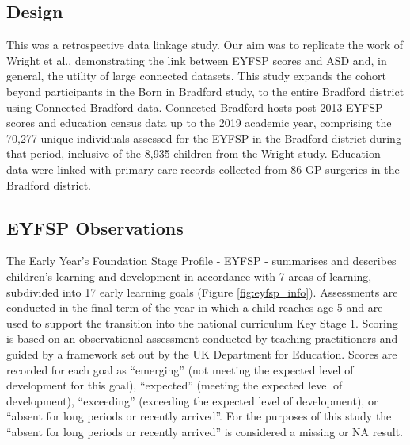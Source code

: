 
\subsection{Design}

This was a retrospective data linkage study. Our aim was to replicate the work of Wright et al., demonstrating the link between EYFSP scores and ASD and, in general, the utility of large connected datasets. This study expands the cohort beyond participants in the Born in Bradford study, to the entire Bradford district using Connected Bradford data. Connected Bradford hosts post-2013 EYFSP scores and education census data up to the 2019 academic year, comprising the 70,277 unique individuals assessed for the EYFSP in the Bradford district during that period, inclusive of the 8,935 children from the Wright study. Education data were linked with primary care records collected from 86 GP surgeries in the Bradford district.

\subsection{EYFSP Observations}

 The Early Year's Foundation Stage Profile - EYFSP - summarises and describes children's learning and development in accordance with 7 areas of learning, subdivided into 17 early learning goals (Figure \ref{fig:eyfsp_info}). Assessments are conducted in the final term of the year in which a child reaches age 5 and are used to support the transition into the national curriculum Key Stage 1. Scoring is based on an observational assessment conducted by teaching practitioners and guided by a framework set out by the UK Department for Education\cite{eyfsp_handbook}. Scores are recorded for each goal as ``emerging'' (not meeting the expected level of development for this goal), ``expected'' (meeting the expected level of development), ``exceeding'' (exceeding the expected level of development), or ``absent for long periods or recently arrived''. For the purposes of this study the ``absent for long periods or recently arrived'' is considered a missing or NA result.

